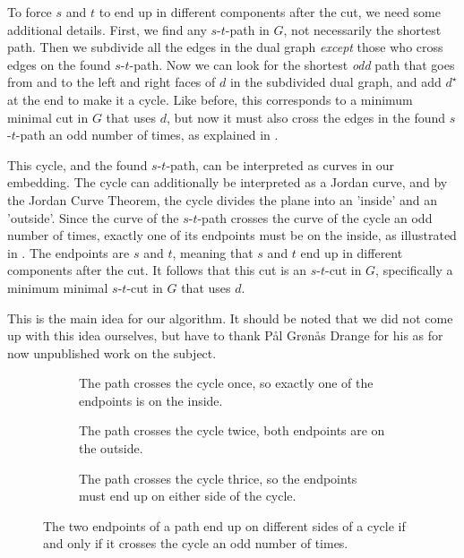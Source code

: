 To force $s$ and $t$ to end up in different components after the cut, we need some additional details. First, we find any $s$-$t$-path in $G$, not necessarily the shortest path. Then we subdivide all the edges in the dual graph \emph{except} those who cross edges on the found $s$-$t$-path. Now we can look for the shortest \emph{odd} path that goes from and to the left and right faces of $d$ in the subdivided dual graph, and add $d^\star$ at the end to make it a cycle. Like before, this corresponds to a minimum minimal cut in $G$ that uses $d$, but now it must also cross the edges in the found $s$-$t$-path an odd number of times, as explained in . 

This cycle, and the found $s$-$t$-path, can be interpreted as curves in our embedding. The cycle can additionally be interpreted as a Jordan curve, and by the Jordan Curve Theorem, the cycle divides the plane into an 'inside' and an 'outside'. Since the curve of the $s$-$t$-path crosses the curve of the cycle an odd number of times, exactly one of its endpoints must be on the inside, as illustrated in . The endpoints are $s$ and $t$, meaning that $s$ and $t$ end up in different components after the cut. It follows that this cut is an $s$-$t$-cut in $G$, specifically a minimum minimal $s$-$t$-cut in $G$ that uses $d$.

This is the main idea for our algorithm. It should be noted that we did not come up with this idea ourselves, but have to thank Pål Grønås Drange \cite{source:pål} for his as for now unpublished work on the subject.

\begin{figure}[H]
    \centering
    \begin{subfigure}{.30\textwidth}
        \centering
        
        \caption{The path crosses the cycle once, so exactly one of the endpoints is on the inside.}
    \end{subfigure}\hfill%
    \begin{subfigure}{.30\textwidth}
        \centering
        
        \caption{The path crosses the cycle twice, both endpoints are on the outside.}
    \end{subfigure}\hfill%
    \begin{subfigure}{.30\textwidth}
        \centering
        
        \caption{The path crosses the cycle thrice, so the endpoints must end up on either side of the cycle.}
    \end{subfigure}
    \caption{The two endpoints of a path end up on different sides of a cycle if and only if it crosses the cycle an odd number of times.}
    \label{figure:jordan-curve-cuts}
\end{figure}

